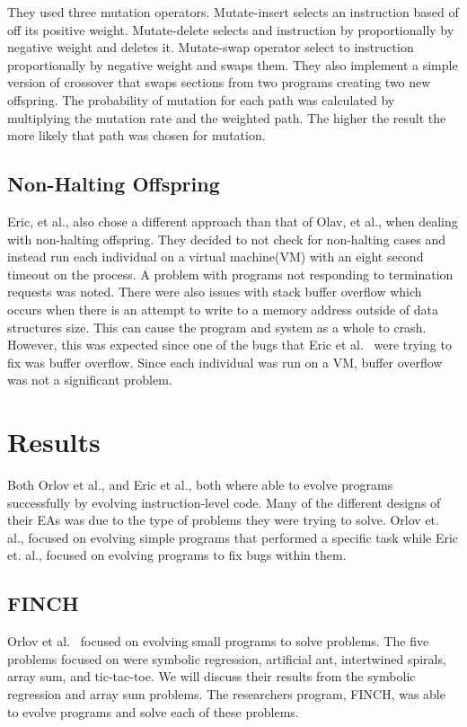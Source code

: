 \documentclass{sig-alternate}
\begin{document}
They used three mutation operators. Mutate-insert selects an instruction based of off its positive weight. Mutate-delete selects and instruction by proportionally by negative weight and deletes it. Mutate-swap operator select to instruction proportionally by negative weight and swaps them. They also implement a simple version of crossover that swaps sections from two programs creating two new offspring. The probability of mutation for each path was calculated by multiplying the mutation rate and the weighted path. The higher the result the more likely that path was chosen for mutation.

\subsection{Non-Halting Offspring}

Eric, et al., also chose a different approach than that of Olav, et al., when dealing with non-halting offspring. They decided to not check for non-halting cases and instead run each individual on a virtual machine(VM) with an eight second timeout on the process. A problem with programs not responding to termination requests was noted. There were also issues with stack buffer overflow which occurs when there is an attempt to write to a memory address outside of data structures size. This can cause the program and system as a whole to crash. However, this was expected since one of the bugs that Eric et al.~\cite{Assembly:2010} were trying to fix was buffer overflow. Since each individual was run on a VM, buffer overflow was not a significant problem.




\section{Results}
Both Orlov et al., and Eric et al., both where able to evolve programs successfully by evolving instruction-level code. Many of the different designs of their EAs was due to the type of problems they were trying to solve. Orlov et. al., focused on evolving simple programs that performed a specific task while Eric et. al., focused on evolving programs to fix bugs within them.

\subsection{FINCH}
Orlov et al.~\cite{FINCH:2011} focused on evolving small programs to solve problems. The five problems focused on were symbolic regression, artificial ant, intertwined spirals, array sum, and tic-tac-toe. We will discuss their results from the symbolic regression and array sum problems. The researchers program, FINCH, was able to evolve programs and solve each of these problems.
\end{document}
